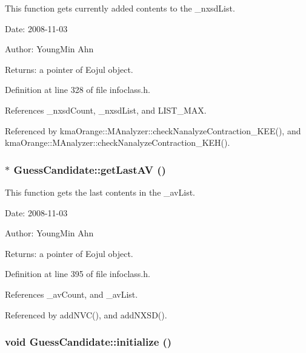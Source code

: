 This function gets currently added contents to the \_\-nxsdList. 

\begin{Desc}
\item[Date:]2008-11-03 \end{Desc}
\begin{Desc}
\item[Author:]YoungMin Ahn \end{Desc}
\begin{Desc}
\item[Returns:]a pointer of Eojul object. \end{Desc}


Definition at line 328 of file infoclass.h.

References \_\-nxsdCount, \_\-nxsdList, and LIST\_\-MAX.

Referenced by kmaOrange::MAnalyzer::checkNanalyzeContraction\_\-KEE(), and kmaOrange::MAnalyzer::checkNanalyzeContraction\_\-KEH().\hypertarget{classGuessCandidate_f82fa6bc098f9833dc45ebd539aa53fe}{
\subsubsection[{getLastAV}]{$\ast$ GuessCandidate::getLastAV ()}}
\label{classGuessCandidate_f82fa6bc098f9833dc45ebd539aa53fe}


This function gets the last contents in the \_\-avList. 

\begin{Desc}
\item[Date:]2008-11-03 \end{Desc}
\begin{Desc}
\item[Author:]YoungMin Ahn \end{Desc}
\begin{Desc}
\item[Returns:]a pointer of Eojul object. \end{Desc}


Definition at line 395 of file infoclass.h.

References \_\-avCount, and \_\-avList.

Referenced by addNVC(), and addNXSD().\hypertarget{classGuessCandidate_a5b6783e92b61856af930a78f8b1c15e}{
\subsubsection[{initialize}]{\setlength{\rightskip}{0pt plus 5cm}void GuessCandidate::initialize ()}}
\label{classGuessCandidate_a5b6783e92b61856af930a78f8b1c15e}


